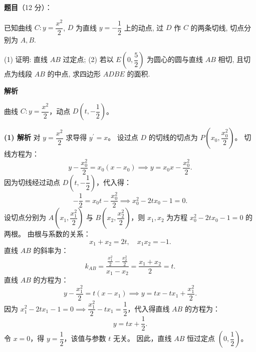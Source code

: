 \begin{answer}

\textbf{题目}（12 分）：

已知曲线 $C: y = \dfrac{x^2}{2}$, $D$ 为直线 $y = -\dfrac{1}{2}$ 上的动点, 过 $D$ 作 $C$ 的两条切线, 切点分别为 $A, B$.

(1) 证明: 直线 $AB$ 过定点;  
(2) 若以 $E\left(0, \dfrac{5}{2}\right)$ 为圆心的圆与直线 $AB$ 相切, 且切点为线段 $AB$ 的中点, 求四边形 $ADBE$ 的面积.

\textbf{解析}

曲线 $C: y = \dfrac{x^2}{2}$，动点 $D\left(t, -\dfrac{1}{2}\right)$。

\textbf{(1) 解析}
对 $y = \dfrac{x^2}{2}$ 求导得 $y^\prime = x$。
设过点 $D$ 的切线的切点为 $P\left(x_0, \dfrac{x_0^2}{2}\right)$。
切线方程为：
\nopagebreak[4]
\[y - \frac{x_0^2}{2} = x_0(x - x_0) \implies y = x_0 x - \frac{x_0^2}{2}.\]
因为切线经过动点 $D\left(t, -\dfrac{1}{2}\right)$，代入得：
\nopagebreak[4]
\[-\frac{1}{2} = x_0 t - \frac{x_0^2}{2} \implies x_0^2 - 2tx_0 - 1 = 0.\]
设切点分别为 $A\left(x_1, \dfrac{x_1^2}{2}\right)$ 与 $B\left(x_2, \dfrac{x_2^2}{2}\right)$，则 $x_1, x_2$ 为方程 $x_0^2 - 2tx_0 - 1 = 0$ 的两根。
由根与系数的关系：
\nopagebreak[4]
\[x_1 + x_2 = 2t, \quad x_1 x_2 = -1.\]
直线 $AB$ 的斜率为：
\nopagebreak[4]
\[k_{AB} = \frac{\frac{x_1^2}{2} - \frac{x_2^2}{2}}{x_1 - x_2} = \frac{x_1 + x_2}{2} = t.\]
直线 $AB$ 的方程为：
\nopagebreak[4]
\[y - \frac{x_1^2}{2} = t(x - x_1) \implies y = tx - tx_1 + \frac{x_1^2}{2}.\]
因为 $x_1^2 - 2tx_1 - 1 = 0 \implies \dfrac{x_1^2}{2} - tx_1 = \dfrac{1}{2}$，代入得直线 $AB$ 的方程为：
\nopagebreak[4]
\[y = tx + \frac{1}{2}.\]
令 $x = 0$，得 $y = \dfrac{1}{2}$，该值与参数 $t$ 无关。
因此，直线 $AB$ 恒过定点 $\left(0, \dfrac{1}{2}\right)$。


\end{answer}
